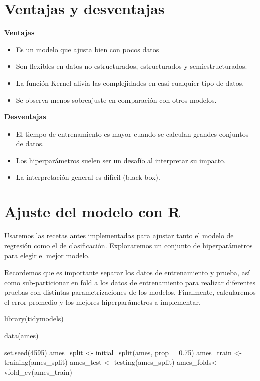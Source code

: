 \documentclass[
]{book}
\newenvironment{Shaded}{\begin{snugshade}}{\end{snugshade}}
\newcommand{\AttributeTok}[1]{\textcolor[rgb]{0.77,0.63,0.00}{#1}}
\newcommand{\DecValTok}[1]{\textcolor[rgb]{0.00,0.00,0.81}{#1}}
\newcommand{\FloatTok}[1]{\textcolor[rgb]{0.00,0.00,0.81}{#1}}
\newcommand{\FunctionTok}[1]{\textcolor[rgb]{0.00,0.00,0.00}{#1}}
\newcommand{\NormalTok}[1]{#1}
\newcommand{\OtherTok}[1]{\textcolor[rgb]{0.56,0.35,0.01}{#1}}
\begin{document}
\hypertarget{ventajas-y-desventajas}{%
\section{Ventajas y desventajas}\label{ventajas-y-desventajas}}

\textbf{Ventajas}

\begin{itemize}
\item
  Es un modelo que ajusta bien con pocos datos
\item
  Son flexibles en datos no estructurados, estructurados y semiestructurados.
\item
  La función Kernel alivia las complejidades en casi cualquier tipo de datos.
\item
  Se observa menos sobreajuste en comparación con otros modelos.
\end{itemize}

\textbf{Desventajas}

\begin{itemize}
\item
  El tiempo de entrenamiento es mayor cuando se calculan grandes conjuntos de datos.
\item
  Los hiperparámetros suelen ser un desafío al interpretar su impacto.
\item
  La interpretación general es difícil (black box).
\end{itemize}

\hypertarget{ajuste-del-modelo-con-r}{%
\section{Ajuste del modelo con R}\label{ajuste-del-modelo-con-r}}

Usaremos las recetas antes implementadas para ajustar tanto el modelo de regresión como el de clasificación. Exploraremos un conjunto de hiperparámetros para elegir el mejor modelo.

Recordemos que es importante separar los datos de entrenamiento y prueba, así como sub-particionar en fold a los datos de entrenamiento para realizar diferentes pruebas con distintas parametrizaciones de los modelos. Finalmente, calcularemos el error promedio y los mejores hiperparámetros a implementar.

\begin{Shaded}
\begin{Highlighting}[]
\FunctionTok{library}\NormalTok{(tidymodels)}

\FunctionTok{data}\NormalTok{(ames)}

\FunctionTok{set.seed}\NormalTok{(}\DecValTok{4595}\NormalTok{)}
\NormalTok{ames\_split }\OtherTok{\textless{}{-}} \FunctionTok{initial\_split}\NormalTok{(ames, }\AttributeTok{prop =} \FloatTok{0.75}\NormalTok{)}
\NormalTok{ames\_train }\OtherTok{\textless{}{-}} \FunctionTok{training}\NormalTok{(ames\_split)}
\NormalTok{ames\_test  }\OtherTok{\textless{}{-}} \FunctionTok{testing}\NormalTok{(ames\_split)}
\NormalTok{ames\_folds}\OtherTok{\textless{}{-}} \FunctionTok{vfold\_cv}\NormalTok{(ames\_train)}
\end{Highlighting}
\end{Shaded}
\end{document}
